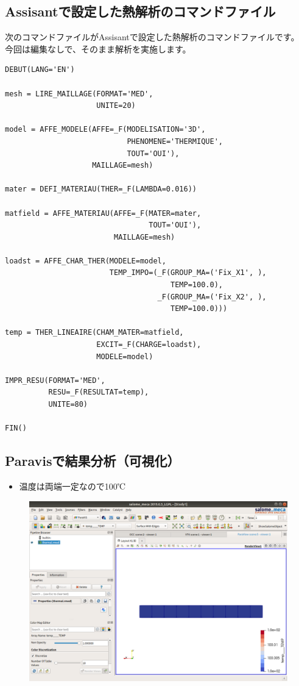 \subsection{Assisantで設定した熱解析のコマンドファイル}
次のコマンドファイルがAssisantで設定した熱解析のコマンドファイルです。\\
今回は編集なしで、そのまま解析を実施します。
\begin{lstlisting}[caption =熱解析コマンドファイル, label=コマンドファイル]
DEBUT(LANG='EN')

mesh = LIRE_MAILLAGE(FORMAT='MED',
                     UNITE=20)

model = AFFE_MODELE(AFFE=_F(MODELISATION='3D',
                            PHENOMENE='THERMIQUE',
                            TOUT='OUI'),
                    MAILLAGE=mesh)

mater = DEFI_MATERIAU(THER=_F(LAMBDA=0.016))

matfield = AFFE_MATERIAU(AFFE=_F(MATER=mater,
                                 TOUT='OUI'),
                         MAILLAGE=mesh)

loadst = AFFE_CHAR_THER(MODELE=model,
                        TEMP_IMPO=(_F(GROUP_MA=('Fix_X1', ),
                                      TEMP=100.0),
                                   _F(GROUP_MA=('Fix_X2', ),
                                      TEMP=100.0)))

temp = THER_LINEAIRE(CHAM_MATER=matfield,
                     EXCIT=_F(CHARGE=loadst),
                     MODELE=model)

IMPR_RESU(FORMAT='MED',
          RESU=_F(RESULTAT=temp),
          UNITE=80)

FIN()
\end{lstlisting}
\clearpage
\subsection{Paravisで結果分析（可視化）}
\begin{itemize}
	\item 温度は両端一定なので100℃
\end{itemize}
\vspace{-\baselineskip}
\begin{figure}[H]
	\centering
	\includegraphics[width=0.8\columnwidth]{fig/thermal.png}
\end{figure}
\clearpage
